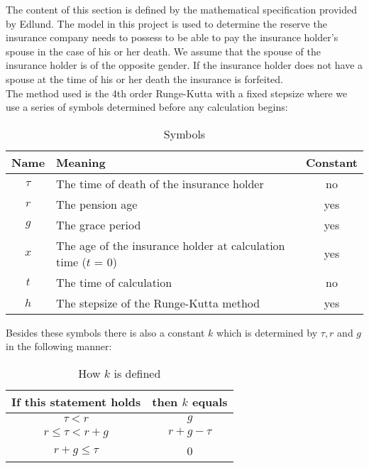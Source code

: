 The content of this section is defined by the mathematical specification\cite{edlu} provided by Edlund. The model in this project is used to determine the reserve the insurance company needs to possess to be able to pay the insurance holder's spouse in the case of his or her death. We assume that the spouse of the insurance holder is of the opposite gender. If the insurance holder does not have a spouse at the time of his or her death the insurance is forfeited. \\

The method used is the 4th order Runge-Kutta with a fixed stepsize \cite{nric} where we use a series of symbols determined before any calculation begins:

\begin{table}
\begin{center}
\begin{tabular}[t]{|c|l|c|}
	\hline
\textbf{Name}&\textbf{Meaning}&\textbf{Constant}\\\hline
$\tau$&The time of death of the insurance holder&no\\\hline
$r$&The pension age&yes\\\hline
$g$&The grace period&yes\\\hline
$x$&The age of the insurance holder at calculation time ($t$ = 0)&yes\\\hline
$t$&The time of calculation&no\\\hline
$h$&The stepsize of the Runge-Kutta method&yes\\\hline
\end{tabular}
\end{center}
\caption{Symbols}
\label{table:constants}
\end{table}

Besides these symbols there is also a constant $k$ which is determined by $\tau, r$ and $g$ in the following manner:

\begin{table}
\begin{center}
	\begin{tabular}[t]{|c|c|}
		\hline
		\textbf{If this statement holds}&\textbf{then $k$ equals}\\\hline
		$\tau < r$&$g$\\\hline
		$r \leq \tau < r + g$& $r + g - \tau$\\\hline
		$r + g \leq \tau$&0\\\hline
	\end{tabular}
\end{center}
\caption{How $k$ is defined}
\end{table}

